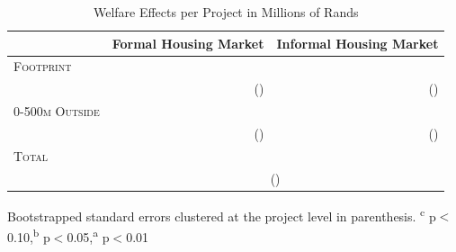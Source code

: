 \documentclass[12pt]{article}
\begin{document}
\begin{table}[h]
\centering
\caption{Welfare Effects per Project in Millions of Rands}\label{table:housingdemandestimates}
\vspace{-2mm}
\begin{threeparttable}
\begin{tabular}{lDD}
\toprule
   &   Formal Housing Market &  Informal Housing Market  \\ \midrule 
\textsc{Footprint} &  &  \\
& (\unskip) & (\unskip) \\[.5em]
\textsc{0-500m Outside} & &  \\
& (\unskip) & (\unskip) \\[.6em]
\textsc{Total} &  \\
                         &  \\
\bottomrule
\end{tabular}
\begin{tablenotes}
\item \footnotesize Bootstrapped standard errors clustered at the project level in parenthesis. \textsuperscript{c} p$<$0.10,\textsuperscript{b} p$<$0.05,\textsuperscript{a} p$<$0.01 \,\,  
\end{tablenotes}
\end{threeparttable}
\end{table}
\end{document}
